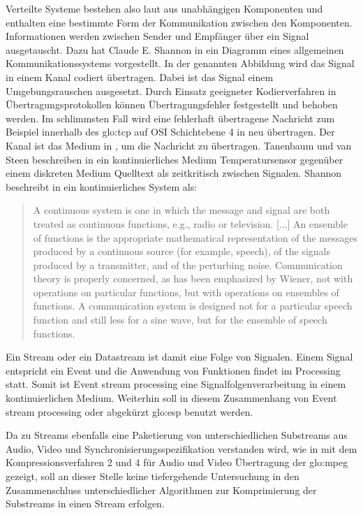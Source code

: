 Verteilte Systeme bestehen also laut  aus unabhängigen Komponenten und enthalten eine bestimmte Form der Kommunikation zwischen den Komponenten. Informationen werden zwischen Sender und Empfänger über ein Signal ausgetauscht. Dazu hat Claude E. Shannon in  ein Diagramm eines allgemeinen Kommunikationssystems vorgestellt. In der genannten Abbildung wird das Signal in einem Kanal codiert übertragen. Dabei ist das Signal einem Umgebungsrauschen ausgesetzt. Durch Einsatz geeigneter Kodierverfahren in Übertragungsprotokollen können Übertragungsfehler festgestellt und behoben werden. Im schlimmsten Fall wird eine fehlerhaft übertragene Nachricht zum Beispiel innerhalb des \gls{glo:tcp} auf OSI Schichtebene 4 in  neu übertragen. Der Kanal ist das Medium in , um die Nachricht zu übertragen. %
Tanenbaum und van Steen beschreiben in  ein kontinuierliches Medium Temperatursensor gegenüber einem diskreten Medium Quelltext als zeitkritisch zwischen Signalen. %
Shannon beschreibt in  ein kontinuierliches System als:

\begin{quote}
A continuous system is one in which the message and signal are both treated as continuous functions, e.g., radio or television. [...]
An ensemble of functions is the appropriate mathematical representation of the messages produced by
a continuous source (for example, speech), of the signals produced by a transmitter, and of the perturbing
noise. Communication theory is properly concerned, as has been emphasized by Wiener, not with operations
on particular functions, but with operations on ensembles of functions. A communication system is designed
not for a particular speech function and still less for a sine wave, but for the ensemble of speech functions.
\end{quote}

Ein Stream oder ein Datastream ist damit eine Folge von Signalen. Einem Signal entspricht ein Event und die Anwendung von Funktionen findet im Processing statt. Somit ist Event stream processing eine Signalfolgenverarbeitung in einem kontinuierlichen Medium. Weiterhin soll in diesem Zusammenhang von Event stream processing oder abgekürzt \acrshort{glo:esp} benutzt werden.

Da zu Streams ebenfalls eine Paketierung von unterschiedlichen Substreams aus Audio, Video und Synchronisierungsspezifikation verstanden wird, wie in  mit dem Kompressionsverfahren 2 und 4 für Audio und Video Übertragung der \gls{glo:mpeg} gezeigt, soll an dieser Stelle keine tiefergehende Untersuchung in den Zusammenschluss unterschiedlicher Algorithmen zur Komprimierung der Substreams in einen Stream erfolgen. 

